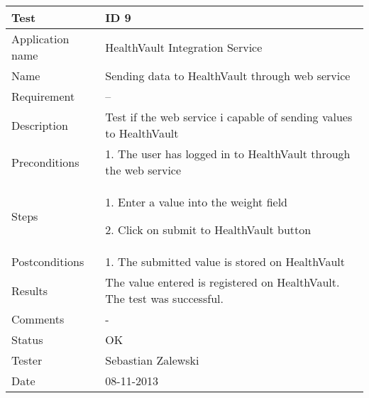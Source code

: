 \begin{table}
\begin{center}
\begin{tabular}{ | l | p{10cm} | }
	\hline
	\textbf{Test}	&	\textbf{ID 9} \\
	\hline\noalign{\smallskip}\noalign{\smallskip}\hline
	Application name	& HealthVault Integration Service \\
	Name				& Sending data to HealthVault through web service \\
	Requirement			& -- \\
	Description			& Test if the web service i capable of sending values to HealthVault \\
	Preconditions		&	\par 1. The user has logged in to HealthVault through the web service \\
	Steps 				&	\par 1. Enter a value into the weight field
							\par 2. Click on submit to HealthVault button \\
	Postconditions		&	\par 1. The submitted value is stored on HealthVault \\
	Results				& The value entered is registered on HealthVault.
						  The test was successful. \\
	Comments			& - \\
	Status				& OK \\
	Tester				& Sebastian Zalewski \\
	Date				& 08-11-2013 \\
	\hline
\end{tabular}
\end{center}
\end{table}

